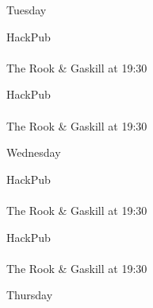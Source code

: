 \documentclass[14pt, landscape]{article}
\begin{document}
\begin{minipage}[t][17cm][t]{\textwidth}
\begin{multicols}{2}

\begin{minipage}{0.5\textwidth}
{\fontsize{30}{40}\selectfont Tuesday}\\
\vspace{0.2cm}
\begin{addmargin}[1em]{0em}

{\fontsize{24}{34}\selectfont \textcolor{emphasistext}{HackPub}}\\
\vspace{0.05cm}\\
{\fontsize{20}{30}\selectfont The Rook \& Gaskill at 19:30}

\vspace{0.5cm}

{\fontsize{24}{34}\selectfont \textcolor{emphasistext}{HackPub}}\\
\vspace{0.05cm}\\
{\fontsize{20}{30}\selectfont The Rook \& Gaskill at 19:30}
\end{addmargin}
\end{minipage}
\vspace{0.75cm}

\begin{minipage}{0.5\textwidth}
{\fontsize{30}{40}\selectfont Wednesday}\\
\vspace{0.2cm}
\begin{addmargin}[1em]{0em}

{\fontsize{24}{34}\selectfont \textcolor{emphasistext}{HackPub}}\\
\vspace{0.05cm}\\
{\fontsize{20}{30}\selectfont The Rook \& Gaskill at 19:30}

\vspace{0.5cm}

{\fontsize{24}{34}\selectfont \textcolor{emphasistext}{HackPub}}\\
\vspace{0.05cm}\\
{\fontsize{20}{30}\selectfont The Rook \& Gaskill at 19:30}
\end{addmargin}
\end{minipage}
\vspace{0.75cm}

\begin{minipage}{0.5\textwidth}
{\fontsize{30}{40}\selectfont Thursday}\\
\vspace{0.2cm}
\begin{addmargin}[1em]{0em}


\end{addmargin}
\end{minipage}
\end{multicols}
\end{minipage}
\end{document}

